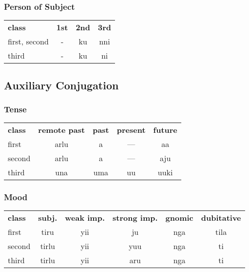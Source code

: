 \documentclass{article}
\begin{document}
\begin{multicols*}{3}
\subsubsection{Person of Subject}
\begin{tabular}{lccc}
\textbf{class} & \textbf{1st} & \textbf{2nd} & \textbf{3rd} \\
first, second & -           & ku          & nni    \\
third & -           & ku          & ni    \\
\end{tabular}

\subsection{Auxiliary Conjugation}

\subsubsection{Tense}
\begin{tabular}{lcccc}
\textbf{class} & \textbf{remote past} & \textbf{past} & \textbf{present} & \textbf{future}\\
first & arlu & a & --- & aa \\
second & arlu & a & --- & aju\\
third & una & uma & uu & uuki\\
\end{tabular}

\subsubsection{Mood}
\begin{tabular}{lccccc}
\textbf{class} & \textbf{subj.} & \textbf{weak imp.} & \textbf{strong imp.} & \textbf{gnomic} & \textbf{dubitative}\\
first &  tiru & yii & ju & nga & tila\\
second & tirlu & yii & yuu & nga & ti\\
third &  tirlu & yii &  aru & nga & ti\\
\end{tabular}


\end{multicols*}
\end{document}
